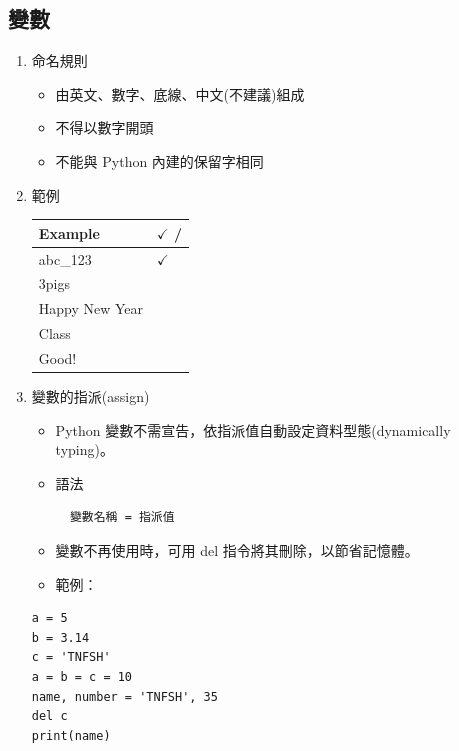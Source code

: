 \documentclass[a4paper,12pt]{article}
\begin{document}
\subsection{變數}
\label{sec:org834b44a}
\begin{enumerate}
\item 命名規則
\label{sec:orga72d853}
\begin{itemize}
\item 由英文、數字、底線、中文(不建議)組成\\
\item 不得以數字開頭\\
\item 不能與 Python 內建的保留字相同\\
\end{itemize}

\item 範例
\label{sec:org44a34db}
\begin{center}
\begin{tabular}{ll}
\hline
Example & \(\checkmark\) / \texttimes{}\\
\hline
abc\_123 & \(\checkmark\)\\
3pigs & \texttimes{}\\
Happy New Year & \texttimes{}\\
Class & \texttimes{}\\
Good! & \texttimes{}\\
\hline
\end{tabular}
\end{center}

\item 變數的指派(assign)
\label{sec:org5f9e6e1}
\begin{itemize}
\item Python 變數不需宣告，依指派值自動設定資料型態(dynamically typing)。\\
\item 語法\\
\lstset{breaklines=true,language=Python,label= ,caption= ,captionpos=b,numbers=none}
\begin{lstlisting}
  變數名稱 = 指派值
\end{lstlisting}
\item 變數不再使用時，可用 del 指令將其刪除，以節省記憶體。\\
\item 範例：\\
\end{itemize}

\lstset{breaklines=true,language=Python,label= ,caption= ,captionpos=b,firstnumber=1,numbers=left}
\begin{lstlisting}
a = 5
b = 3.14
c = 'TNFSH'
a = b = c = 10
name, number = 'TNFSH', 35
del c
print(name)
\end{lstlisting}
\end{enumerate}
\end{document}
